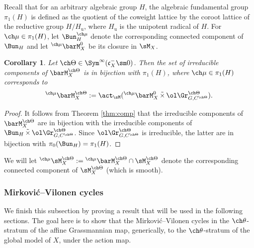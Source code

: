 \documentclass[final]{amsart}
\newtheorem{cor}[subsubsection]{Corollary}
\theoremstyle{remark}
\theoremstyle{definition}
\DeclareMathOperator*{\ttimes}{\tilde\times}
\numberwithin{equation}{section}
\begin{document}
\subsubsection{}
Recall that for an arbitrary algebraic group $H$, the algebraic fundamental
group $\pi_1(H)$ is defined as the quotient of the coweight lattice by the coroot lattice
of the reductive group $H/H_{\mathrm u}$, where $H_{\mathrm u}$ is the unipotent
radical of $H$.
For $\ch\mu\in \pi_1(H)$, let $\Bun_H^{\ch\mu}$ denote the
corresponding connected component of $\Bun_H$ and let $^{\ch\mu}\barM_X^0$ 
be its closure in $\sM_X$.

\begin{cor} \label{cor:strata-comp} 
Let $\ch\Theta \in \Sym^\infty( \mathfrak c_X^- \sm 0)$. 
Then the set of irreducible components of $\barM^{\ch\Theta}_X$ is in bijection 
with $\pi_1(H)$, where $\ch\mu\in \pi_1(H)$ corresponds to 
\[ ^{\ch\mu}\barM_X^{\ch\Theta} := 
\act_\sM(^{\ch\mu}\barM^0_X \ttimes \ol\Gr^{\ch\Theta}_{G,C^{\ch\Theta}}). 
\] 
\end{cor}

\begin{proof}
 It follows from Theorem \ref{thm:comp} that the irreducible
components of $\barM^{\ch\Theta}_X$ are in bijection with the
irreducible components of $\Bun_H \ttimes \ol\Gr^{\ch\Theta}_{G,C^{\ch\Theta}}$. 
Since $\ol\Gr^{\ch\Theta}_{G,C^{\ch\Theta}}$ is irreducible, the
latter are in bijection with $\pi_0(\Bun_H) = \pi_1(H)$.
\end{proof}

We will let $^{\ch\mu}\sM_X^{\ch\Theta} := {^{\ch\mu}}\barM_X^{\ch\Theta} \cap \sM_X^{\ch\Theta}$
denote the corresponding connected component of $\sM_X^{\ch\Theta}$ (which is smooth). 

\subsubsection{Mirkovi\'c--Vilonen cycles} 

We finish this subsection by proving a result that will be used in the following sections. The goal here is to show that the Mirkovi\'c--Vilonen cycles in the $\ch\theta$-stratum of the affine Grassmannian map, generically, to the $\ch\theta$-stratum of the global model of $X$, under the action map.
\end{document}
